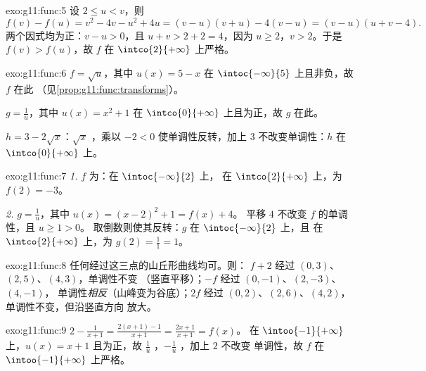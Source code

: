 \begin{solution}{exo:g11:func:5}
设 $2 \leq u < v$，则
\[
f(v) - f(u) = v^2 - 4v - u^2 + 4u = (v-u)(v+u) - 4(v-u)
= (v - u)(u + v - 4).
\]
两个因式均为正：$v - u > 0$，且 $u + v > 2 + 2 = 4$，因为
$u \geq 2$，$v > 2$。于是 $f(v) > f(u)$，故 $f$ 在
$\intco{2}{+\infty}$ 上严格。
\end{solution}

\begin{solution}{exo:g11:func:6}
$f = \sqrt{u}$，其中 $u(x) = 5 - x$ 在
$\intoc{-\infty}{5}$ 上且非负，故 $f$ 在此
（见\cref{prop:g11:func:transforms}）。

$g = \frac1u$，其中 $u(x) = x^2 + 1$ 在
$\intco{0}{+\infty}$ 上且为正，故 $g$ 在此。

$h = 3 - 2\sqrt x$：$\sqrt x$ ，乘以 $-2 < 0$
使单调性反转，加上 $3$ 不改变单调性：$h$ 在
$\intco{0}{+\infty}$ 上。
\end{solution}

\begin{solution}{exo:g11:func:7}
\emph{1.} $f$ 为：在 $\intoc{-\infty}{2}$ 上，
在 $\intco{2}{+\infty}$ 上，为 $f(2) = -3$。

\emph{2.} $g = \frac{1}{u}$，其中 $u(x) = (x-2)^2 + 1 = f(x) + 4$。
平移 $4$ 不改变 $f$ 的单调性，且 $u \geq 1 > 0$。
取倒数则使其反转：$g$ 在 $\intoc{-\infty}{2}$ 上，且
在 $\intco{2}{+\infty}$ 上，为
$g(2) = \frac{1}{1} = 1$。
\end{solution}

\begin{solution}{exo:g11:func:8}
任何经过这三点的山丘形曲线均可。则：
$f + 2$ 经过 $(0,3)$、$(2,5)$、$(4,3)$，单调性不变
（竖直平移）；$-f$ 经过 $(0,-1)$、$(2,-3)$、$(4,-1)$，
单调性\emph{相反}（山峰变为谷底）；$2f$ 经过
$(0,2)$、$(2,6)$、$(4,2)$，单调性不变，但沿竖直方向
放大。
\end{solution}

\begin{solution}{exo:g11:func:9}
$2 - \frac{1}{x+1} = \frac{2(x+1) - 1}{x+1} = \frac{2x+1}{x+1} = f(x)$。
在 $\intoo{-1}{+\infty}$ 上，$u(x) = x + 1$ 且为正，故
$\frac1u$ ，$-\frac1u$ ，加上 $2$ 不改变
单调性，故 $f$ 在 $\intoo{-1}{+\infty}$ 上严格。
\end{solution}

